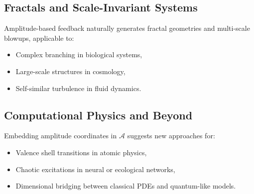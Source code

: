 \documentclass[12pt]{article}
\begin{document}
\subsection{Fractals and Scale-Invariant Systems}
Amplitude-based feedback naturally generates fractal geometries and multi-scale blowups, applicable to:
\begin{itemize}
    \item Complex branching in biological systems,
    \item Large-scale structures in cosmology,
    \item Self-similar turbulence in fluid dynamics.
\end{itemize}

\subsection{Computational Physics and Beyond}
Embedding amplitude coordinates in $\mathcal{A}$ suggests new approaches for:
\begin{itemize}
    \item Valence shell transitions in atomic physics,
    \item Chaotic excitations in neural or ecological networks,
    \item Dimensional bridging between classical PDEs and quantum-like models.
\end{itemize}
\end{document}
